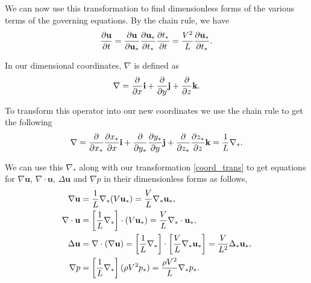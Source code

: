 We can now use this transformation to find dimensionless forms of the various terms of the governing equations. By the chain rule, we have
\begin{equation}
    \pdv{\mathbf{u}}{t} = \pdv{\mathbf{u}}{\mathbf{u_*}} \pdv{\mathbf{u_*}}{t_*} \pdv{t_*}{t} = \frac{V^2}{L} \pdv{\mathbf{u_*}}{t_*}.
\label{dut*}
\end{equation}

In our dimensional coordinates, $ \nabla$ is defined as
\begin{equation}
    \nabla = \pdv{x} \mathbf{i} + \pdv{y} \mathbf{j} + \pdv{z} \mathbf{k}.
\end{equation}

To transform this operator into our new coordinates we use the chain rule to get the following 
\begin{equation}
    \nabla = \pdv{x_*} \pdv{x_*}{x} \mathbf{i} + \pdv{y_*} \pdv{y_*}{y} \mathbf{j} + \pdv{z_*} \pdv{z_*}{z} \mathbf{k} = \frac{1}{L} \nabla_*.
\end{equation}

We can use this $ \nabla_*$ along with our transformation \eqref{coord_trans} to get equations for $ \nabla \mathbf{u}$, $ \nabla \cdot \mathbf{u}$, $ \Delta \mathbf{u}$ and $ \nabla p$ in their dimensionless forms as follows,
\begin{align}
    \nabla \mathbf{u} &= \frac{1}{L} \nabla_*(V \mathbf{u_*}) = \frac{V}{L} \nabla_* \mathbf{u_*}, \label{gradu*} \\
    \nabla \cdot \mathbf{u} &= \left[\frac{1}{L} \nabla_*\right] \cdot (V \mathbf{u_*}) = \frac{V}{L} \nabla_* \cdot \mathbf{u_*}, \label{divu*} \\
    \Delta \mathbf{u} &= \nabla \cdot (\nabla \mathbf{u} ) = \left[\frac{1}{L} \nabla_*\right] \cdot \left[\frac{V}{L} \nabla_* \mathbf{u_*}\right] = \frac{V}{L^2} \Delta_* \mathbf{u_*}, \label{lapu*} \\
    \nabla p &= \left[\frac{1}{L} \nabla_*\right](\rho V^2 p_*) = \frac{\rho V^2}{L} \nabla_* p_*. \label{gradp*}
\end{align}

